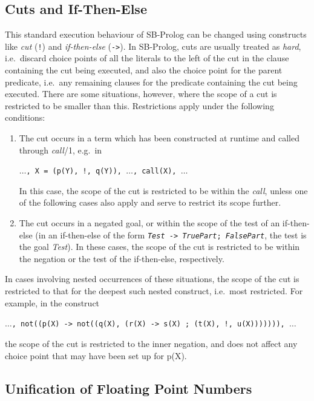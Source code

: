 \subsection{Cuts and If-Then-Else}\label{cuts_and_if-then-else}
This standard execution behaviour of SB-Prolog can be changed using
constructs like {\em cut} ({\tt !})
and {\em if-then-else} ({\tt ->}).
In SB-Prolog, cuts are usually treated as {\em hard},
i.e.\ discard choice points
of all the literals to the left of the cut in the clause containing the cut
being executed, and also the choice point for the parent predicate,
i.e.\ any remaining clauses for the predicate containing the cut being executed.
There are some situations, however, where the scope of a cut is restricted
to be smaller than this.
Restrictions apply under the following conditions:
\begin{enumerate}
\item
    The cut occurs in a term which has been constructed at runtime and called
    through {\em call}/1, e.g.\ in
    \begin{center}
    {\tt $\ldots$, X = (p(Y), !, q(Y)), $\ldots$, call(X), $\ldots$}
    \end{center}
    In this case, the scope of the cut is restricted to be within the
    {\em call}, unless one of the following cases also apply and serve to
    restrict its scope further.
\item
    The cut occurs in a negated goal, or within the scope of the test of an
    if-then-else (in an if-then-else of the form
    {\tt {\em Test} -> {\em TruePart}; {\em FalsePart}},
    the test is the goal {\em Test}).
    In these cases, the scope of the cut is restricted to be within the negation
    or the test of the if-then-else, respectively.
\end{enumerate}

In cases involving nested occurrences of these situations, the scope of the
cut is restricted to that for the deepest such nested construct, i.e.\ most
restricted.
For example, in the construct
\begin{center}
{\tt $\ldots$, not((p(X) -> not((q(X), (r(X) -> s(X) ;
    (t(X), !, u(X))))))), $\ldots$}
\end{center}
the scope of the cut is restricted to the inner negation, and does not
affect any choice point that may have been set up for p(X).

\subsection{Unification of Floating Point Numbers}

